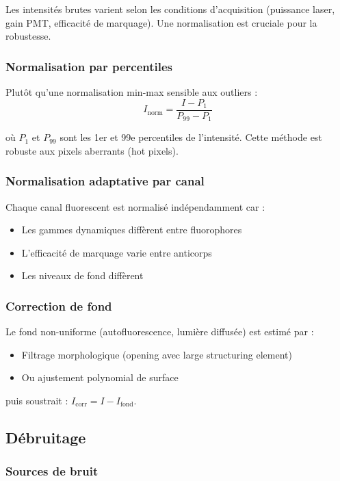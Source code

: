 Les intensités brutes varient selon les conditions d'acquisition (puissance laser, gain PMT, efficacité de marquage). Une normalisation est cruciale pour la robustesse.

\subsubsection{Normalisation par percentiles}

Plutôt qu'une normalisation min-max sensible aux outliers :
\[
I_{\text{norm}} = \frac{I - P_1}{P_{99} - P_1}
\]

où $P_1$ et $P_{99}$ sont les 1er et 99e percentiles de l'intensité. Cette méthode est robuste aux pixels aberrants (hot pixels).

\subsubsection{Normalisation adaptative par canal}

Chaque canal fluorescent est normalisé indépendamment car :
\begin{itemize}
    \item Les gammes dynamiques diffèrent entre fluorophores
    \item L'efficacité de marquage varie entre anticorps
    \item Les niveaux de fond diffèrent
\end{itemize}

\subsubsection{Correction de fond}

Le fond non-uniforme (autofluorescence, lumière diffusée) est estimé par :
\begin{itemize}
    \item Filtrage morphologique (opening avec large structuring element)
    \item Ou ajustement polynomial de surface
\end{itemize}

puis soustrait : $I_{\text{corr}} = I - I_{\text{fond}}$.

\subsection{Débruitage}

\subsubsection{Sources de bruit}

